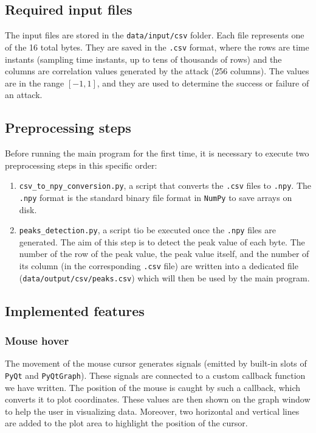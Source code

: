 \documentclass[11pt,a4paper]{article}
\begin{document}
\subsection{Required input files}
The input files are stored in the \texttt{data/input/csv} folder. Each file represents one of the 16 total bytes.
They are saved in the \texttt{.csv} format, where the rows are time instants (sampling time instants, up to tens of thousands of rows) and the columns are correlation values generated by the attack (256 columns).
The values are in the range $[-1, 1]$, and they are used to determine the success or failure of an attack.

\subsection{Preprocessing steps}
Before running the main program for the first time, it is necessary to execute two preprocessing steps in this specific order:
\begin{enumerate}
    \item \texttt{csv\_to\_npy\_conversion.py}, a script that converts the \texttt{.csv} files to \texttt{.npy}. The \texttt{.npy} format is the standard binary file format in \texttt{NumPy} to save arrays on disk.
    \item \texttt{peaks\_detection.py}, a script tio be executed once the \texttt{.npy} files are generated. The aim of this step is to detect the peak value of each byte. The number of the row of the peak value, the peak value itself, and the number of its column (in the corresponding \texttt{.csv} file) are written into a dedicated file (\texttt{data/output/csv/peaks.csv}) which will then be used by the main program.
\end{enumerate}

\subsection{Implemented features}
\subsubsection{Mouse hover}
The movement of the mouse cursor generates signals (emitted by built-in slots of \texttt{PyQt} and \texttt{PyQtGraph}).
These signals are connected to a custom callback function we have written.
The position of the mouse is caught by such a callback, which converts it to plot coordinates.
These values are then shown on the graph window to help the user in visualizing data.
Moreover, two horizontal and vertical lines are added to the plot area to highlight the position of the cursor.
\end{document}
